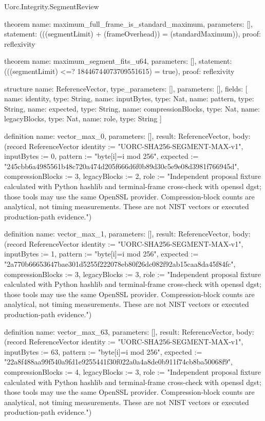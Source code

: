 \begin{lexlean}{Uorc.Integrity.SegmentReview}
\begin{semanticmodule}
theorem{
  name: maximum_full_frame_is_standard_maximum,
  parameters: [],
  statement: (((segmentLimit) + (frameOverhead)) = (standardMaximum)),
  proof: reflexivity{}
}

theorem{
  name: maximum_segment_fits_u64,
  parameters: [],
  statement: (((segmentLimit) <=? 18446744073709551615) = true),
  proof: reflexivity{}
}

structure{
  name: ReferenceVector,
  type_parameters: [],
  parameters: [],
  fields: [
    {name: identity, type: String},
    {name: inputBytes, type: Nat},
    {name: pattern, type: String},
    {name: expected, type: String},
    {name: compressionBlocks, type: Nat},
    {name: legacyBlocks, type: Nat},
    {name: role, type: String}
  ]
}

definition{
  name: vector_max_0,
  parameters: [],
  result: ReferenceVector,
  body: (record ReferenceVector {identity := "UORC-SHA256-SEGMENT-MAX-v1", inputBytes := 0, pattern := "byte[i]=i mod 256", expected := "245cbb6a4985561b48c720a474d205f666d6f0b89d30c5e9e08d3981f766945d", compressionBlocks := 3, legacyBlocks := 2, role := "Independent proposal fixture calculated with Python hashlib and terminal-frame cross-check with openssl dgst; those tools may use the same OpenSSL provider. Compression-block counts are analytical, not timing measurements. These are not NIST vectors or executed production-path evidence."})
}

definition{
  name: vector_max_1,
  parameters: [],
  result: ReferenceVector,
  body: (record ReferenceVector {identity := "UORC-SHA256-SEGMENT-MAX-v1", inputBytes := 1, pattern := "byte[i]=i mod 256", expected := "2a770b66653647bae301d5255f222078eb80f26dc082f92ab15caa8da45f84fc", compressionBlocks := 3, legacyBlocks := 3, role := "Independent proposal fixture calculated with Python hashlib and terminal-frame cross-check with openssl dgst; those tools may use the same OpenSSL provider. Compression-block counts are analytical, not timing measurements. These are not NIST vectors or executed production-path evidence."})
}

definition{
  name: vector_max_63,
  parameters: [],
  result: ReferenceVector,
  body: (record ReferenceVector {identity := "UORC-SHA256-SEGMENT-MAX-v1", inputBytes := 63, pattern := "byte[i]=i mod 256", expected := "22a8f488aa99f540a9fd1e9255441f30f022a0a4a8de0b911f74cb8ba50068f9", compressionBlocks := 4, legacyBlocks := 3, role := "Independent proposal fixture calculated with Python hashlib and terminal-frame cross-check with openssl dgst; those tools may use the same OpenSSL provider. Compression-block counts are analytical, not timing measurements. These are not NIST vectors or executed production-path evidence."})
}


\end{semanticmodule}
\end{lexlean}
